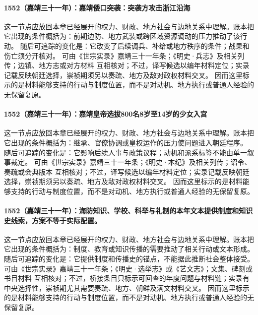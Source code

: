 \paragraph{1552（嘉靖三十一年）：嘉靖倭口突袭：突袭方攻击浙江沿海} 这一节点应放回本章已经展开的权力、财政、地方社会与边地关系中理解。账本把它出现的条件概括为：前期边防、地方武装或跨区域资源调动的压力推动了该行动。 随后可追踪的变化是：它改变了后续调兵、补给或地方秩序的条件；战果和伤亡须分开核对。 可由《世宗实录》嘉靖三十一年条；《明史·兵志》及相关列传；边镇、地方志或对方材料 互相核对；不过，译写候选以编年材料定位；实录记载反映朝廷选择，崇祯期须另以奏疏、地方及敌对政权材料交叉。 因而这里标示的是材料能够支持的行动与制度位置，而不是对动机、地方执行或普通人经验的无保留复原。

\paragraph{1552（嘉靖三十一年）：嘉靖皇帝选拔800名8岁至14岁的少女入宫} 这一节点应放回本章已经展开的权力、财政、地方社会与边地关系中理解。账本把它出现的条件概括为：继承、官僚协调或皇权运作的压力使问题进入朝廷程序。 随后可追踪的变化是：它影响后续人事与政策议程；动机和派系标签不能由单一叙事裁定。 可由《世宗实录》嘉靖三十一年条；《明史·本纪》及相关列传；诏令、奏疏或会典版本 互相核对；不过，译写候选以编年材料定位；实录记载反映朝廷选择，崇祯期须另以奏疏、地方及敌对政权材料交叉。 因而这里标示的是材料能够支持的行动与制度位置，而不是对动机、地方执行或普通人经验的无保留复原。

\paragraph{1552（嘉靖三十一年）：海防知识、学校、科举与礼制的本年文本提供制度和知识史线索，方案不等于实际配置。} 这一节点应放回本章已经展开的权力、财政、地方社会与边地关系中理解。账本把它出现的条件概括为：制度、教育或知识传播的需要推动了相关行动或文本形成。 随后可追踪的变化是：它提供制度和传播史的锚点，不能据此推断社会整体接受。 可由《世宗实录》嘉靖三十一年条；《明史·选举志》或《艺文志》；文集、碑刻或书目材料 互相核对；不过，桥接条目只标示可回查的年度问题与材料链；实录有中央选择性，崇祯期尤其需要奏疏、地方、朝鲜及满文材料交叉。 因而这里标示的是材料能够支持的行动与制度位置，而不是对动机、地方执行或普通人经验的无保留复原。

